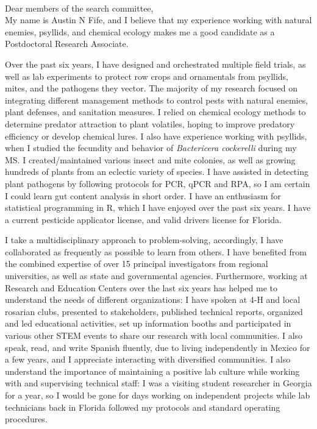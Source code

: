 \documentclass[11pt]{letter} %
\begin{document}
\begin{letter}
\\
Dear members of the search committee,\\

My name is Austin N Fife, and I believe that my experience working with natural enemies, psyllids, and chemical ecology makes me a good candidate as a Postdoctoral Research Associate.

Over the past six years, I have designed and orchestrated multiple field trials, as well as lab experiments to protect row crops and ornamentals from psyllids, mites, and the pathogens they vector. The majority of my research focused on integrating different management methods to control pests with natural enemies, plant defenses, and sanitation measures. I relied on chemical ecology methods to determine predator attraction to plant volatiles, hoping to improve predatory efficiency or develop chemical lures. I also have experience working with psyllids, when I studied the fecundity and behavior of \textit{Bactericera cockerelli} during my MS. I created/maintained various insect and mite colonies, as well as growing hundreds of plants from an eclectic variety of species. I have assisted in detecting plant pathogens by following protocols for PCR, qPCR and RPA, so I am certain I could learn gut content analysis in short order. I have an enthusiasm for statistical programming in R, which I have enjoyed over the past six years. I have a current pesticide applicator license, and valid drivers license for Florida.

I take a multidisciplinary approach to problem-solving, accordingly, I have collaborated as frequently as possible to learn from others. I have benefited from the combined expertise of over 15 principal investigators from regional universities, as well as state and governmental agencies. Furthermore, working at Research and Education Centers over the last six years has helped me to understand the needs of different organizations: I have spoken at 4-H and local rosarian clubs, presented to stakeholders, published technical reports, organized and led educational activities, set up information booths and participated in various other STEM events to share our research with local communities. I also speak, read, and write Spanish fluently, due to living independently in Mexico for a few years, and I appreciate interacting with diversified communities. I also understand the importance of maintaining a positive lab culture while working with and supervising technical staff: I was a visiting student researcher in Georgia for a year, so I would be gone for days working on independent projects while lab technicians back in Florida followed my protocols and standard operating procedures.


\end{letter}
\end{document}
